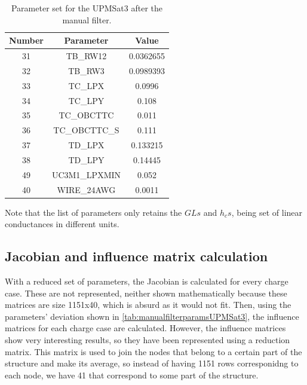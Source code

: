     \begin{table}[H]
        \centering
        \caption{Parameter set for the UPMSat3 after the manual filter.}
        \label{tab:manualfilterparamsUPMSat3-2}
    \begin{tabular}{ccc}
        \hline
        Number & Parameter & Value \\
        \hline
    31 & TB\_RW12 & 0.0362655 \\
    32 & TB\_RW3 & 0.0989393 \\
    33 & TC\_LPX & 0.0996 \\
    34 & TC\_LPY & 0.108 \\
    35 & TC\_OBCTTC & 0.011 \\
    36 & TC\_OBCTTC\_S & 0.111 \\
    37 & TD\_LPX & 0.133215 \\
    38 & TD\_LPY & 0.14445 \\
    49 & UC3M1\_LPXMIN & 0.052   \\
    40 & WIRE\_24AWG & 0.0011  \\

    \bottomrule
    \end{tabular}
\end{table}
Note that the list of parameters only retains the $GLs$ and $h_cs$, being set of linear conductances in different units.

\subsection{Jacobian and influence matrix calculation}
With a reduced set of parameters, the Jacobian is calculated for every charge case. These are not represented, neither shown mathematically because these matrices are size 1151x40, which is absurd as it would not fit. Then, using the parameters' deviation shown in \autoref{tab:manualfilterparamsUPMSat3}, the influence matrices for each charge case are calculated. However, the influence matrices show very interesting results, so they have been represented using a reduction matrix. This matrix is used to join the nodes that belong to a certain part of the structure and make its average, so instead of having 1151 rows corresponidng to each node, we have 41 that correspond to some part of the structure.

